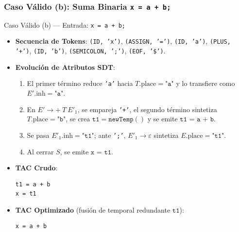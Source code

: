 \documentclass[11pt, letterpaper]{article}
\begin{document}
\subsubsection{Caso Válido (b): Suma Binaria \texttt{x = a + b;}}
\begin{tracebox}{Caso Válido (b) --- Entrada: \texttt{x = a + b;}}
\begin{itemize}[leftmargin=1.5em, itemsep=2pt]
    \item \textbf{Secuencia de Tokens}: \texttt{(ID, 'x')}, \texttt{(ASSIGN, '=')}, \texttt{(ID, 'a')}, \texttt{(PLUS, '+')}, \texttt{(ID, 'b')}, \texttt{(SEMICOLON, ';')}, \texttt{(EOF, '\$')}.
    \item \textbf{Evolución de Atributos SDT}:
    \begin{enumerate}[leftmargin=1.5em]
        \item El primer término reduce \texttt{'a'} hacia $T.\text{place} = \texttt{"a"}$ y lo transfiere como $E'.\text{inh} = \texttt{"a"}$.
        \item En $E' \rightarrow \textbf{+}\ T\ E'_1$, se empareja \texttt{'+'}, el segundo término sintetiza $T.\text{place} = \texttt{"b"}$, se crea $\texttt{t1} = \texttt{newTemp}()$ y se emite $\texttt{t1 = a + b}$.
        \item Se pasa $E'_1.\text{inh} = \texttt{"t1"}$; ante \texttt{';'}, $E'_1 \rightarrow \varepsilon$ sintetiza $E.\text{place} = \texttt{"t1"}$.
        \item Al cerrar $S$, se emite $\texttt{x = t1}$.
    \end{enumerate}
    \item \textbf{TAC Crudo}:
    \begin{lstlisting}[numbers=none]
t1 = a + b
x = t1
    \end{lstlisting}
    \item \textbf{TAC Optimizado} (fusión de temporal redundante $\texttt{t1}$):
    \begin{lstlisting}[numbers=none]
x = a + b
    \end{lstlisting}
\end{itemize}
\end{tracebox}

\end{document}
